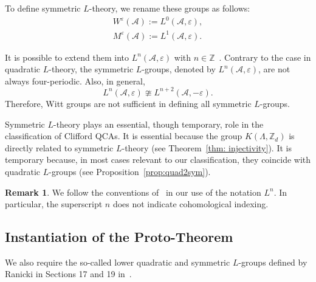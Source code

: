\documentclass{article}
\theoremstyle{definition}
\newtheorem{rmk}[theorem]{Remark}
\newcommand{\CA}{{ \mathcal A}}
\newcommand{\ZZ}{{\mathbb Z}}
\begin{document}
To define symmetric \( L \)-theory, we rename these groups as follows:
\begin{align*}
    W^{\varepsilon}(\mathcal{A}) := L^0(\mathcal{A},\varepsilon), \\
M^{\varepsilon}(\mathcal{A}) := L^1(\mathcal{A}, \varepsilon).
\end{align*}

It is possible to extend them into $L^n(\CA, \varepsilon)$ with $n\in \ZZ$~\cite{ranicki1973algebraic,ranicki1989additive}. Contrary to the case in quadratic $L$-theory, the symmetric $L$-groups, denoted by $L^n(\CA, \varepsilon)$, are not always four-periodic. Also, in general, $$L^n(\CA, \varepsilon)\ncong L^{n+2}(\CA, -\varepsilon).$$ Therefore, Witt groups are not sufficient in defining all symmetric $L$-groups. 
 

Symmetric \( L \)-theory plays an essential, though temporary, role in the classification of Clifford QCAs. It is essential because the group \( K(\Lambda, \mathbb{Z}_d) \) is directly related to symmetric \( L \)-theory (see Theorem~\ref{thm: injectivity}). It is temporary because, in most cases relevant to our classification, they coincide with quadratic \( L \)-groups (see Proposition~\ref{prop:quad2sym}).

\begin{rmk}
We follow the conventions of~\cite{ranicki1992lower} in our use of the notation \( L^n \). In particular, the superscript \( n \) does not indicate cohomological indexing.
\end{rmk}


\subsection{Instantiation of the Proto-Theorem}

We also require the so-called lower quadratic and symmetric $L$-groups defined by Ranicki in Sections 17 and 19 in~\cite{ranicki1992lower}. 
\end{document}
